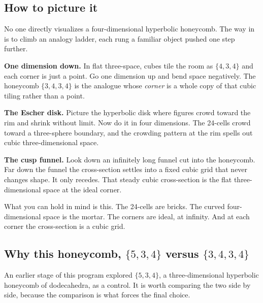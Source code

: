 \subsection{How to picture it}

No one directly visualizes a four-dimensional hyperbolic honeycomb. The way in is to climb an analogy ladder, each rung a familiar object pushed one step further.

\textbf{One dimension down.} In flat three-space, cubes tile the room as $\{4,3,4\}$ and each corner is just a point. Go one dimension up and bend space negatively. The honeycomb $\{3,4,3,4\}$ is the analogue whose \emph{corner} is a whole copy of that cubic tiling rather than a point.

\textbf{The Escher disk.} Picture the hyperbolic disk where figures crowd toward the rim and shrink without limit. Now do it in four dimensions. The 24-cells crowd toward a three-sphere boundary, and the crowding pattern at the rim spells out cubic three-dimensional space.

\textbf{The cusp funnel.} Look down an infinitely long funnel cut into the honeycomb. Far down the funnel the cross-section settles into a fixed cubic grid that never changes shape. It only recedes. That steady cubic cross-section is the flat three-dimensional space at the ideal corner.

What you can hold in mind is this. The 24-cells are bricks. The curved four-dimensional space is the mortar. The corners are ideal, at infinity. And at each corner the cross-section is a cubic grid.

\subsection{Why this honeycomb, $\{5,3,4\}$ versus $\{3,4,3,4\}$}

An earlier stage of this program explored $\{5,3,4\}$, a three-dimensional hyperbolic honeycomb of dodecahedra, as a control. It is worth comparing the two side by side, because the comparison is what forces the final choice.

